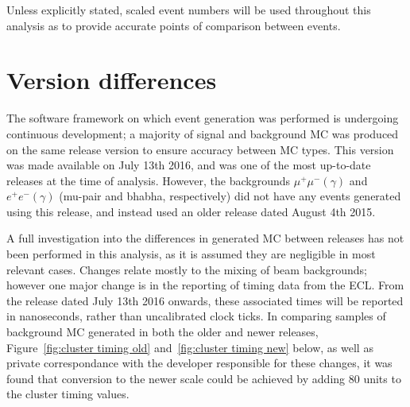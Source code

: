 \documentclass[12pt]{thesis}  %
\begin{document}
Unless explicitly stated, scaled event numbers will be used throughout this analysis as to provide accurate points of comparison between events.


\section{Version differences}

The software framework on which event generation was performed is undergoing continuous development; a majority of signal and background MC was produced on the same release version to ensure accuracy between MC types. This version was made available on July 13th 2016, and was one of the most up-to-date releases at the time of analysis. However, the backgrounds $\mu^+\mu^-(\gamma)$ and $e^+ e^-(\gamma)$ (mu-pair and bhabha, respectively) did not have any events generated using this release, and instead used an older release dated August 4th 2015.

A full investigation into the differences in generated MC between releases has not been performed in this analysis, as it is assumed they are negligible in most relevant cases. Changes relate mostly to the mixing of beam backgrounds; however one major change is in the reporting of timing data from the ECL. From the release dated July 13th 2016 onwards, these associated times will be reported in nanoseconds, rather than uncalibrated clock ticks\cite{BelleII:cluster-timing}. In comparing samples of background MC generated in both the older and newer releases, Figure~\ref{fig:cluster timing old} and~\ref{fig:cluster timing new} below, as well as private correspondance with the developer responsible for these changes, it was found that conversion to the newer scale could be achieved by adding 80 units to the cluster timing values.
\end{document}
